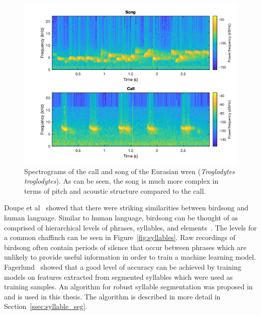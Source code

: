 \begin{figure}[ht]
  \centering
  \includegraphics[width=\textwidth]{figures/wren_call_song_spectrogram.png}
  \caption{Spectrograms of the call and song of the Eurasian wren
    (\textit{Troglodytes troglodytes}). As can be seen, the song is much more complex in terms of pitch and acoustic structure compared to the
  call.}\label{fig:wren_call_song_spectrogram}
\end{figure}

Doupe et al~\cite{birdsongspeech} showed that there were striking similarities
between birdsong and human language. Similar to human language, birdsong can be
thought of as comprised of hierarchical levels of phrases, syllables, and
elements~\cite{catchpole2003bird}. The levels for a common chaffinch can be seen
in Figure~\ref{fig:syllables}. Raw recordings of birdsong
often contain periods of silence that occur between phrases which are unlikely
to provide useful information in order to train a machine learning model.
Fagerlund~\cite{fagerlund2007bird} showed that a good level of accuracy can be
achieved by training models on features extracted from segmented syllables which
were used as training samples. An algorithm for robust syllable segmentation was
proposed in~\cite{fagerlund2004automatic} and is used in this thesis. The
algorithm is described in more detail in Section~\ref{ssec:syllable_seg}.

